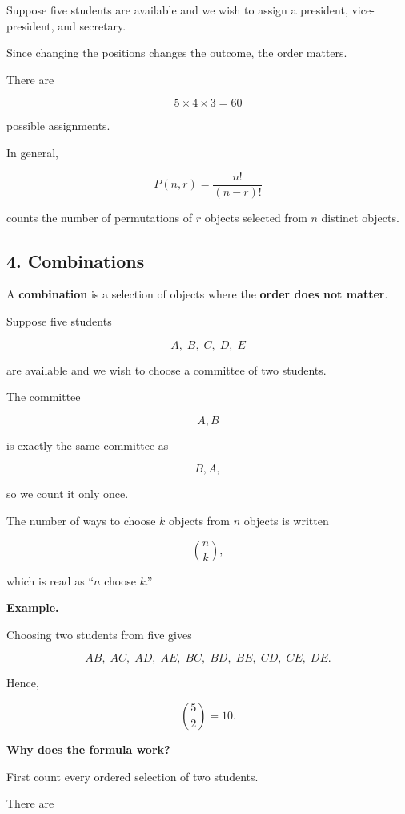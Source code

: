 \documentclass[12pt]{article}
\begin{document}
Suppose five students are available and we wish to assign a president,
vice-president, and secretary.

Since changing the positions changes the outcome, the order matters.

There are

\[
5\times4\times3=60
\]

possible assignments.

In general,

\[
P(n,r)=\frac{n!}{(n-r)!}
\]

counts the number of permutations of $r$ objects selected from $n$
distinct objects.


\subsection*{4. Combinations}

A \textbf{combination} is a selection of objects where the
\textbf{order does not matter}.

Suppose five students

\[
A,\;B,\;C,\;D,\;E
\]

are available and we wish to choose a committee of two students.

The committee

\[
A,B
\]

is exactly the same committee as

\[
B,A,
\]

so we count it only once.

The number of ways to choose $k$ objects from $n$ objects is written

\[
\binom nk,
\]

which is read as ``$n$ choose $k$.''

\bigskip

\textbf{Example.}

Choosing two students from five gives

\[
AB,\;
AC,\;
AD,\;
AE,\;
BC,\;
BD,\;
BE,\;
CD,\;
CE,\;
DE.
\]

Hence,

\[
\binom52=10.
\]

\bigskip

\textbf{Why does the formula work?}

First count every ordered selection of two students.

There are
\end{document}
